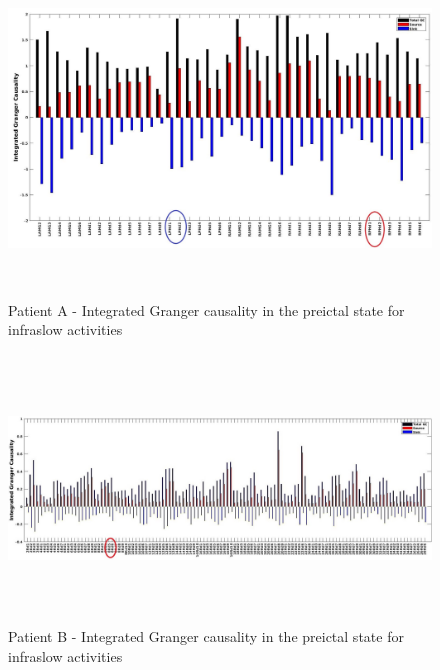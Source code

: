 \begin{figure}
\centerline{
	\includegraphics[height =3.5in]{Plots/Patient_A_preictal_low.jpg}
	}

	\caption{Patient A -  Integrated Granger causality in the preictal state for infraslow activities}

	\label{fig:apdx_patient_a_preictal_low}
\end{figure}


\begin{figure}
\centerline{
	\includegraphics[height =2.8in]{Plots/Patient_B_preictal_low.jpg}
	}

	\caption{Patient B - Integrated Granger causality in the preictal state for infraslow activities}

	\label{fig:apdx_patient_b_preictal_low}
\end{figure}


